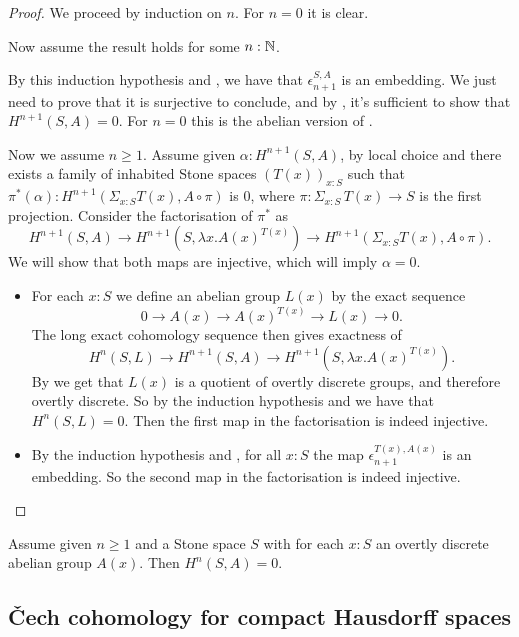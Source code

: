 \begin{proof}
  We proceed by induction on $n$. For $n=0$ it is clear.
  
  Now assume the result holds for some $n:\mathbb{N}$.
  
  By this induction hypothesis and , we have that $\epsilon_{n+1}^{S,A}$ is an embedding. We just need to prove that it is surjective to conclude, and by , it's sufficient to show that $H^{n+1}(S,A) = 0$. For $n=0$ this is the abelian version of . 
  
  Now we assume $n\geq 1$. Assume given $\alpha:H^{n+1}(S,A)$, by local choice and  there exists a family of inhabited Stone spaces $(T(x))_{x:S}$ such that $\pi^*(\alpha) : H^{n+1}(\Sigma_{x:S}T(x), A\circ\pi)$ is $0$, where $\pi:\Sigma_{x:S}\,T(x)\to S$ is the first projection. Consider the factorisation of $\pi^*$ as
  \[ H^{n+1}(S,A)\to H^{n+1}(S,\lambda x.A(x)^{T(x)}) \to H^{n+1}(\Sigma_{x:S}T(x), A\circ\pi). \]
  We will show that both maps are injective, which will imply $\alpha=0$.

\begin{itemize}
 \item For each $x:S$ we define an abelian group $L(x)$ by the exact sequence
  \[  0\to A(x) \to A(x)^{T(x)} \to L(x) \to 0. \]
The long exact cohomology sequence then gives exactness of
\[ H^n(S,L)\to H^{n+1}(S,A)\to H^{n+1}(S,\lambda x. A(x)^{T(x)}).\]
By  we get that $L(x)$ is a quotient of overtly discrete groups, and therefore overtly discrete. So by the induction hypothesis and  we have that $H^n(S,L)=0$. Then the first map in the factorisation is indeed injective.
\item By the induction hypothesis and , for all $x:S$ the map $\epsilon_{n+1}^{T(x),A(x)}$ is an embedding. So the second map in the factorisation is indeed injective. 
\end{itemize}
\end{proof}

\begin{corollary}\label{vanishing-cohomology-stone}
Assume given $n\geq 1$ and a Stone space $S$ with for each $x:S$ an overtly discrete abelian group $A(x)$. Then $H^n(S,A) = 0$.
\end{corollary}



\subsection{\v{C}ech cohomology for compact Hausdorff spaces}
\label{cech-sheaf-agree-section}

